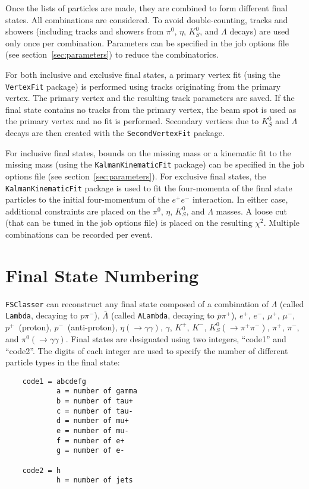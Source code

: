\documentclass[11pt,a4paper]{define/cepcnote}
\begin{document}
Once the lists of particles are made, they are combined to form different final states.  All combinations are considered.  To avoid double-counting, tracks and showers (including tracks and showers from $\pi^0$, $\eta$, $K^0_S$, and $\Lambda$ decays) are used only once per combination.  Parameters can be specified in the job options file (see section~\ref{sec:parameters}) to reduce the combinatorics.

For both inclusive and exclusive final states, a primary vertex fit (using the {\tt VertexFit} package) is performed using tracks originating from the primary vertex.  The primary vertex and the resulting track parameters are saved.  If the final state contains no tracks from the primary vertex, the beam spot is used as the primary vertex and no fit is performed.  Secondary vertices due to $K^0_S$ and $\Lambda$ decays are then created with the {\tt SecondVertexFit} package.

For inclusive final states, bounds on the missing mass or a kinematic fit to the missing mass (using the {\tt KalmanKinematicFit} package) can be specified in the job options file (see section~\ref{sec:parameters}).  For exclusive final states, the {\tt KalmanKinematicFit} package is used to fit the four-momenta of the final state particles to the initial four-momentum of the $e^+e^-$ interaction.  In either case, additional constraints are placed on the $\pi^0$, $\eta$, $K^0_S$, and $\Lambda$ masses.  A loose cut (that can be tuned in the job options file) is placed on the resulting $\chi^2$.  Multiple combinations can be recorded per event.


\section{Final State Numbering}
\label{sec:numbering}

{\tt FSClasser} can reconstruct any final state composed of a combination of $\Lambda$ (called {\tt Lambda}, decaying to $p\pi^-$), $\overline\Lambda$ (called {\tt ALambda}, decaying to $\overline{p}\pi^+$), $e^+$, $e^-$, $\mu^+$, $\mu^-$, $p^+$~(proton), $p^-$~(anti-proton), $\eta(\to\gamma\gamma)$, $\gamma$, $K^+$, $K^-$, $K^0_S(\to\pi^+\pi^-)$, $\pi^+$, $\pi^-$, and $\pi^0(\to\gamma\gamma)$.  Final states are designated using two integers, ``code1'' and ``code2''.  The digits of each integer are used to specify the number of different particle types in the final state:
\begin{verbatim}
    code1 = abcdefg
            a = number of gamma
            b = number of tau+
            c = number of tau-
            d = number of mu+
            e = number of mu- 
            f = number of e+  
            g = number of e- 

    code2 = h
            h = number of jets                
\end{verbatim}
\end{document}
